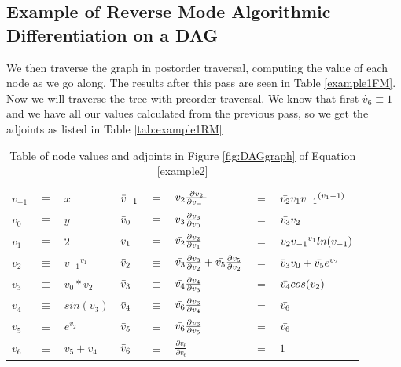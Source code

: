 \documentclass{article}
\begin{document}
\subsection{Example of Reverse Mode Algorithmic Differentiation on a DAG}


We then traverse the graph in postorder traversal, computing the value of each node as we go along. The results after this pass are seen in Table \ref{example1FM}. Now we will traverse the tree with preorder traversal. We know that first $\dot{v_6} \equiv 1$ and we have all our values calculated from the previous pass, so we get the adjoints as listed in Table \ref{tab:example1RM}


\begin{table}[h!]
    \centering
    \begin{tabular}{|lcl|lclll|}
        \hline
        $v_{-1}$ & $\equiv$ & $x$ & $\Bar{v}_{-1}$ & $\equiv$ & $\Bar{v_2}\frac{\partial{v_2}}{\partial{v_{-1}}}$ & $=$ & $\Bar{v_2}v_1 {v_{-1}}^{(v_{1}-1)}$\\
        $v_{0}$ & $\equiv$ & $y$ & $\Bar{v}_{0}$ & $\equiv$ & $\Bar{v_3}\frac{\partial{v_3}}{\partial{v_0}}$ & $=$ & $\Bar{v_3}v_2$\\
        \hline
        $v_{1}$ & $\equiv$ & $2$ & $\Bar{v}_{1}$ & $\equiv$ & $\Bar{v_2}\frac{\partial{v_2}}{\partial{v_1}}$ & $=$ & $\Bar{v}_{2}{v_{-1}}^{v_{1}}ln(v_{-1})$\\
        $v_{2}$ & $\equiv$ & ${v_{-1}}^{v_{1}}$ & $\Bar{v}_{2}$ & $\equiv$ & $\Bar{v_3}\frac{\partial{v_3}}{\partial{v_2}} + \Bar{v_5}\frac{\partial{v_5}}{\partial{v_2}}$ & $=$ & $\Bar{v}_{3}v_0 + \Bar{v_5}e^{v_2}$\\
        $v_{3}$ & $\equiv$ & ${v_{0}}*{v_{2}}$ & $\Bar{v}_{3}$ & $\equiv$ & $\Bar{v_4}\frac{\partial{v_4}}{\partial{v_3}}$ & $=$ & $\Bar{v_4}cos(v_2)$\\
        $v_{4}$ & $\equiv$ & $sin(v_3)$ & $\Bar{v}_{4}$ & $\equiv$ & $\Bar{v_6}\frac{\partial{v_6}}{\partial{v_4}}$ & $=$ & $\Bar{v_6}$\\
        $v_{5}$ & $\equiv$ & $e^{v_2}$ & $\Bar{v}_{5}$ & $\equiv$ & $\Bar{v_6}\frac{\partial{v_6}}{\partial{v_5}}$ & $=$ & $\Bar{v_6}$\\
        \hline
        $v_{6}$ & $\equiv$ & $v_5 + v_4$ & $\Bar{v}_{6}$ & $\equiv$ & $\frac{\partial{v_6}}{\partial{v_6}}$ & $=$ & $1$\\
        \hline
    \end{tabular}
    \caption{Table of node values and adjoints in Figure \ref{fig:DAGgraph} of Equation \ref{example2}}
    \label{tab:example1}
\end{table}
\end{document}
